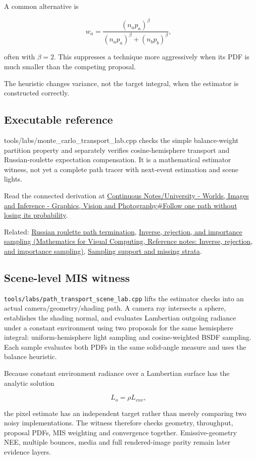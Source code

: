 A common alternative is

\[
w_a=
\frac{(n_a p_a)^\beta}
{(n_a p_a)^\beta+(n_b p_b)^\beta},
\]

often with \(\beta=2\). This suppresses a technique more aggressively when its PDF is much smaller than the competing proposal.

The heuristic changes variance, not the target integral, when the estimator is constructed correctly.

\subsection{Executable reference}\label{appendix-ca8898faf1a6-executable-reference}

tools/labs/monte\_carlo\_transport\_lab.cpp checks the simple balance-weight partition property and separately verifies cosine-hemisphere transport and Russian-roulette expectation compensation. It is a mathematical estimator witness, not yet a complete path tracer with next-event estimation and scene lights.

Read the connected derivation at \hyperref[03-visual-computing-i-ch007-follow-one-path-without-losing-its-probability]{Continuous Notes/University - Worlds, Images and Inference - Graphics, Vision and Photography\#Follow one path without losing its probability}.

Related: \hyperref[appendix-7277c62d4599]{Russian roulette path termination}, \href{../02-Mathematics-for-Visual-Computing/main.pdf\#nameddest=appendix-8d863ed954d0}{Inverse, rejection, and importance sampling (Mathematics for Visual Computing, Reference notes: Inverse, rejection, and importance sampling)}, \hyperref[appendix-10308c3d753e]{Sampling support and missing strata}.

\subsection{Scene-level MIS witness}\label{appendix-ca8898faf1a6-scene-level-mis-witness}

\texttt{tools/labs/path\_transport\_scene\_lab.cpp} lifts the estimator checks into an actual camera/geometry/shading path. A camera ray intersects a sphere, establishes the shading normal, and evaluates Lambertian outgoing radiance under a constant environment using two proposals for the same hemisphere integral: uniform-hemisphere light sampling and cosine-weighted BSDF sampling. Each sample evaluates both PDFs in the same solid-angle measure and uses the balance heuristic.

Because constant environment radiance over a Lambertian surface has the analytic solution

\[
L_o = \rho L_{env},
\]

the pixel estimate has an independent target rather than merely comparing two noisy implementations. The witness therefore checks geometry, throughput, proposal PDFs, MIS weighting and convergence together. Emissive-geometry NEE, multiple bounces, media and full rendered-image parity remain later evidence layers.
